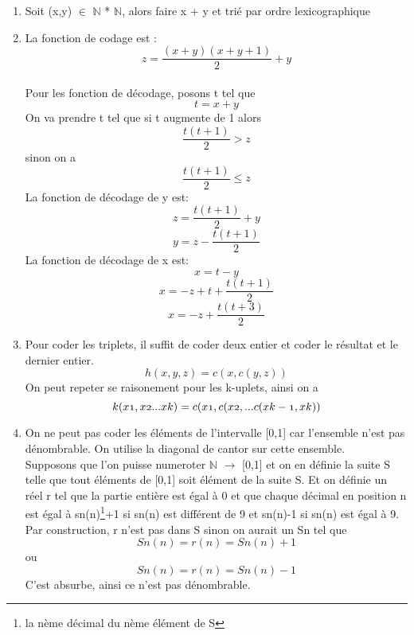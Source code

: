 \documentclass[]{article}
\begin{document}
\begin{enumerate}
\item Soit (x,y) $\in$ $\mathbb{N}$ * $\mathbb{N}$, alors faire x + y et trié par ordre lexicographique
\item La fonction de codage est : \[z = \frac{(x+y)(x+y+1)}{2} + y\]\\
Pour les fonction de décodage, posons t tel que \[t = x + y\]
On va prendre t tel que si t augmente de 1 alors \[\frac{t(t+1)}{2} > z\] sinon on a \[\frac{t(t+1)}{2} \le z\]
La fonction de décodage de y est: \[z =\frac{t(t+1)}{2} + y\] \[y = z - \frac{t(t+1)}{2}\]
La fonction de décodage de x est: \[x = t - y\] \[x = -z + t + \frac{t(t+1)}{2}\] \[x = -z + \frac{t(t+3)}{2}\]
\item Pour coder les triplets, il suffit de coder deux entier et coder le résultat et le dernier entier. 
  \[h(x,y,z)=c(x , c(y,z))\]
On peut repeter se raisonement pour les k-uplets, ainsi on a 
\[k(x\oldstylenums{1},x\oldstylenums{2}... x\oldstylenums{k}) = c(x\oldstylenums{1} , c(x\oldstylenums{2} , ... c(x\oldstylenums{k-1},x\oldstylenums{k}))\]
\item On ne peut pas coder les éléments de l'intervalle [0,1] car l'ensemble n'est pas dénombrable. On utilise la diagonal de cantor sur cette ensemble.\\
Supposons que l'on puisse numeroter $\mathbb{N}$  $\rightarrow$ [0,1] et on en définie la suite S telle que tout éléments de [0,1] soit élément de la suite S.
Et on définie un réel r tel que la partie entière est égal à 0 et que chaque décimal en position n est égal à sn(n)\footnote{la nème décimal du nème élément de S}+1 si sn(n) est différent de 9 et sn(n)-1 si sn(n) est égal à 9.\\
Par construction, r n'est pas dans S sinon on aurait un Sn tel que \[Sn(n)=r(n)=Sn(n)+1\] ou \[Sn(n)=r(n)=Sn(n)-1\] C'est absurbe, ainsi ce n'est pas dénombrable. 
   
  
\end{enumerate}
\end{document}
